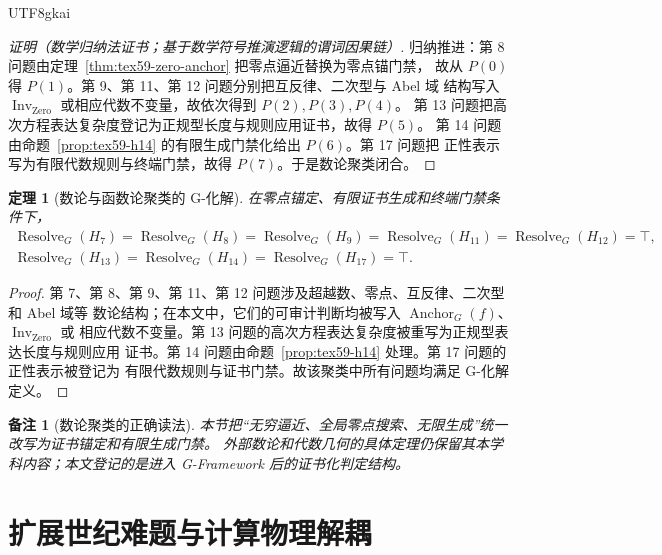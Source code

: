 \documentclass[12pt]{article}
\newtheorem{theorem}{定理}[section]
\newtheorem{remark}{备注}[section]
\newcommand{\GFramework}{\textsf{G-Framework}}
\DeclareMathOperator{\Resolve}{Resolve}
\DeclareMathOperator{\Inv}{Inv}
\DeclareMathOperator{\Zero}{Zero}
\DeclareMathOperator{\Anchor}{Anchor}
\begin{document}
\begin{CJK*}{UTF8}{gkai}
\begin{proof}[证明（数学归纳法证书；基于数学符号推演逻辑的谓词因果链）]
归纳推进：第 8 问题由定理~\ref{thm:tex59-zero-anchor} 把零点逼近替换为零点锚门禁，
故从 \(P(0)\) 得 \(P(1)\)。第 9、第 11、第 12 问题分别把互反律、二次型与 Abel 域
结构写入 \(\Inv_{\Zero}\) 或相应代数不变量，故依次得到 \(P(2),P(3),P(4)\)。
第 13 问题把高次方程表达复杂度登记为正规型长度与规则应用证书，故得 \(P(5)\)。
第 14 问题由命题~\ref{prop:tex59-h14} 的有限生成门禁化给出 \(P(6)\)。第 17 问题把
正性表示写为有限代数规则与终端门禁，故得 \(P(7)\)。于是数论聚类闭合。
\end{proof}

\begin{theorem}[数论与函数论聚类的 G-化解]
\label{thm:tex59-number-cluster}
在零点锚定、有限证书生成和终端门禁条件下，
\[
\begin{gathered}
  \Resolve_G(H_7)=\Resolve_G(H_8)=\Resolve_G(H_9)=
  \Resolve_G(H_{11})=\Resolve_G(H_{12})=\top,\\
  \Resolve_G(H_{13})=\Resolve_G(H_{14})=\Resolve_G(H_{17})=\top.
\end{gathered}
\]
\end{theorem}

\begin{proof}
第 7、第 8、第 9、第 11、第 12 问题涉及超越数、零点、互反律、二次型和 Abel 域等
数论结构；在本文中，它们的可审计判断均被写入 \(\Anchor_G(f)\)、\(\Inv_{\Zero}\) 或
相应代数不变量。第 13 问题的高次方程表达复杂度被重写为正规型表达长度与规则应用
证书。第 14 问题由命题~\ref{prop:tex59-h14} 处理。第 17 问题的正性表示被登记为
有限代数规则与证书门禁。故该聚类中所有问题均满足 G-化解定义。
\end{proof}

\begin{remark}[数论聚类的正确读法]
本节把“无穷逼近、全局零点搜索、无限生成”统一改写为证书锚定和有限生成门禁。
外部数论和代数几何的具体定理仍保留其本学科内容；本文登记的是进入
\GFramework{} 后的证书化判定结构。
\end{remark}

\section[扩展世纪难题与计算物理解耦]{扩展世纪难题与计算物理解耦}
\label{sec:tex59-extended-obstructions}


\end{CJK*}
\end{document}
